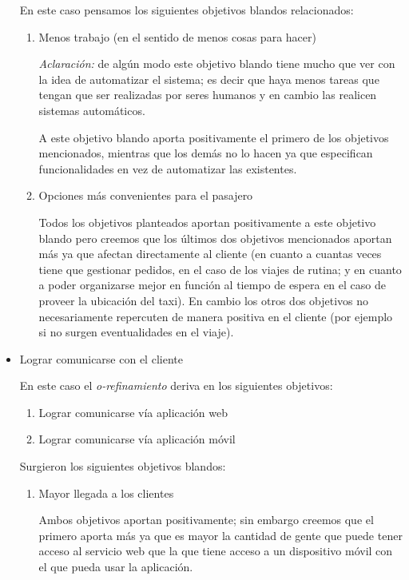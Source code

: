 \documentclass[a4paper, 10pt, twoside]{article}
\begin{document}
\begin{itemize}
  En este caso pensamos los siguientes objetivos blandos relacionados:
  
  \begin{enumerate}
    \item Menos trabajo (en el sentido de menos cosas para hacer)

      \emph{Aclaración:} de algún modo este objetivo blando tiene mucho que ver con la idea de automatizar el sistema; es decir que haya menos tareas que tengan que ser realizadas por seres humanos y en cambio las realicen sistemas automáticos.
	
      A este objetivo blando aporta positivamente el primero de los objetivos mencionados, mientras que los demás no lo hacen ya que especifican funcionalidades en vez de automatizar las existentes.
      
    \item Opciones más convenientes para el pasajero
      
      Todos los objetivos planteados aportan positivamente a este objetivo blando pero creemos que los últimos dos objetivos mencionados aportan más ya que afectan directamente al cliente (en cuanto a cuantas veces tiene que gestionar pedidos, en el caso de los viajes de rutina; y en cuanto a poder organizarse mejor en función al tiempo de espera en el caso de proveer la ubicación del taxi). En cambio los otros dos objetivos no necesariamente repercuten de manera positiva en el cliente (por ejemplo si no surgen eventualidades en el viaje).
  \end{enumerate}

\item Lograr comunicarse con el cliente
  
  En este caso el \emph{o-refinamiento} deriva en los siguientes objetivos:
  
  \begin{enumerate}
    \item Lograr comunicarse vía aplicación web
    \item Lograr comunicarse vía aplicación móvil
  \end{enumerate}
  
  Surgieron los siguientes objetivos blandos:
  
  \begin{enumerate}
    \item Mayor llegada a los clientes

      Ambos objetivos aportan positivamente; sin embargo creemos que el primero aporta más ya que es mayor la cantidad de gente que puede tener acceso al servicio web que la que tiene acceso a un dispositivo móvil con el que pueda usar la aplicación.
      

\end{enumerate}
\end{itemize}
\end{document}
